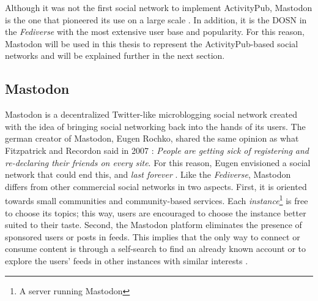 
Although it was not the first social network to implement ActivityPub, Mastodon is the one that pioneered its use on a large scale \cite{lemmer-webber_2017}. In addition, it is the DOSN in the \emph{Fediverse} with the most extensive user base and popularity. For this reason, Mastodon will be used in this thesis to represent the ActivityPub-based social networks and will be explained further in the next section. 

\subsection{Mastodon}\label{subsec:mastodon}

 Mastodon is a decentralized Twitter-like microblogging social network created with the idea of bringing social networking back into the hands of its users. The german creator of Mastodon, Eugen Rochko, shared the same opinion as what Fitzpatrick and Recordon said in 2007 \cite{fitzpatrick_recordon_2007}: \emph{People are getting sick of registering and re-declaring their friends on every site}. For this reason, Eugen envisioned a social network that could end this, and \emph{last forever} \cite{tilley_2018}. Like the \emph{Fediverse}, Mastodon differs from other commercial social networks in two aspects. First, it is oriented towards small communities and community-based services. Each \emph{instance}\footnote{A server running Mastodon} is free to choose its topics; this way, users are encouraged to choose the instance better suited to their taste. Second, the Mastodon platform eliminates the presence of sponsored users or posts in feeds. This implies that the only way to connect or consume content is through a self-search to find an already known account or to explore the users' feeds in other instances with similar interests \cite{8845221}. 
 
